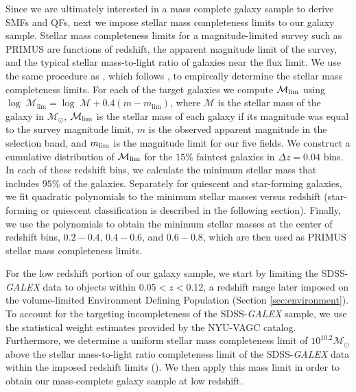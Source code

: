 \documentclass{emulateapj}
\begin{document}
Since we are ultimately interested in a mass complete galaxy sample to
derive SMFs and QFs, next we impose stellar mass completeness limits
to our galaxy sample.
Stellar mass completeness limits for a magnitude-limited survey such as PRIMUS are functions of redshift, the apparent magnitude limit of the survey, and the typical stellar mass-to-light ratio of galaxies near the flux limit. We use the same procedure as \cite{Moustakas:2013aa}, which follows \cite{Pozzetti:2010aa}, to empircally determine the stellar mass completeness limits. For each of the target galaxies we compute $\mathcal{M}_{\rm{lim}}$ using $\log \; \mathcal{M}_{\mathrm{lim}} = \log \; \mathcal{M} + 0.4 (m - m_{\mathrm{lim}})$, where $\mathcal{M}$ is the stellar mass of the galaxy in $\mathcal{M_{\odot}}$, $\mathcal{M}_{\rm{lim}}$ is the stellar mass of each galaxy if its magnitude was equal to the survey magnitude limit, $m$ is the observed apparent magnitude in the selection band, and $m_{\rm{lim}}$ is the magnitude limit for our five fields. We construct a cumulative distribution of $\mathcal{M}_{\rm{lim}}$ for the $15\%$ faintest galaxies in $\Delta z=0.04$ bins. In each of these redshift bins, we calculate the minimum stellar mass that includes $95 \%$ of the galaxies. Separately for quiescent and star-forming galaxies, we fit quadratic polynomials to the minimum stellar masses versus redshift (star-forming or quiescent classification is described in the following section). Finally, we use the polynomials to obtain the minimum stellar masses at the center of redshift bins, $0.2-0.4$, $0.4-0.6$, and $0.6-0.8$, which are then used as PRIMUS stellar mass completeness limits.

For the low redshift portion of our galaxy sample, we start by limiting the SDSS-{\em GALEX} data to objects within $0.05 < z < 0.12$, a redshift range later imposed on the volume-limited Environment Defining Population (Section \ref{sec:environment}). To account for the targeting incompleteness of the SDSS-{\em GALEX} sample, we use the statistical weight estimates provided by the NYU-VAGC catalog. Furthermore, we determine a uniform stellar mass completeness limit of $10^{10.2} \mathcal{M}_{\odot}$ above the stellar mass-to-light ratio completeness limit of the SDSS-{\em GALEX} data within the imposed redshift limits (\citealt{Blanton:2005ab, Baldry:2008aa, Moustakas:2013aa}). We then apply this mass limit in order to obtain our mass-complete galaxy sample at low redshift. 
\end{document}
